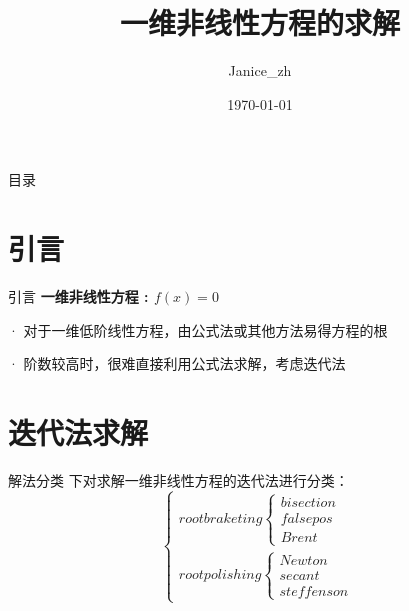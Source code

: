 \documentclass{ctexbeamer}        %
\begin{document}
	
	\title{一维非线性方程的求解}
	\author{Janice\_zh}
	\date{\today}
	\frame{\titlepage}
	
	\begin{frame}{目录}         %
		\tableofcontents[hideallsubsections]
	\end{frame}
	
	\section{引言}    %
	
	
	\begin{frame}{引言}
		\textbf{一维非线性方程 : $f(x)=0$}\\ \par
		
		· 对于一维低阶线性方程，由公式法或其他方法易得方程的根\par
		
		· 阶数较高时，很难直接利用公式法求解，考虑迭代法
	\end{frame}
	
	\section{迭代法求解}
	\begin{frame}{解法分类}
		下对求解一维非线性方程的迭代法进行分类：
		$$
		\begin{cases}
		root  braketing 
		\begin{cases}bisection\\falsepos\\Brent
		\end{cases}
		\\
		root  polishing 
		
		\begin{cases}
		Newton\\
		secant \\
		steffenson 
		\end{cases}
		\end{cases}
		$$
	\end{frame}
\end{document}
